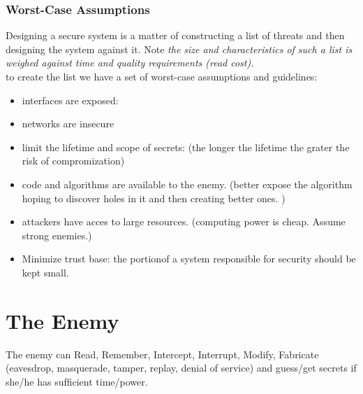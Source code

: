 \subsubsection{Worst-Case Assumptions }
Designing a secure system is a matter of constructing a list of threats and then designing the system against it. Note \textit{the size and characteristics of such a list is weighed against time and quality requirements (read cost).}\\

to create the list we have a set of worst-case assumptions and guidelines:

\begin{itemize}
\item interfaces are exposed: 
\item networks are insecure
\item limit the lifetime and scope of secrets: (the longer the lifetime the grater the risk of compromization)
\item code and algorithms are available to the enemy. (better expose the algorithm hoping to discover holes in it and then creating better ones. )
\item attackers have acces to large resources. (computing power is cheap. Assume strong enemies.)
\item Minimize trust base: the portionof a system responsible for security should be kept small. 
\end{itemize}

\section{The Enemy}

The enemy can Read, Remember, Intercept, Interrupt, Modify, Fabricate 
(eavesdrop, masquerade, tamper, replay, denial of service) and guess/get secrets if she/he has sufﬁcient time/power.




